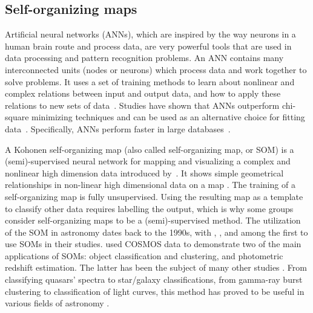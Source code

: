 \subsection{Self-organizing maps}
 \label{sec: som}


 Artificial neural networks (ANNs), which are inspired by the way neurons in a human brain route and process data, are very powerful tools that are used in data processing and pattern recognition problems.
An ANN contains many interconnected units (nodes or neurons) which process data and work together to solve problems.
It uses a set of training methods to learn about nonlinear and complex relations between input and output data, and how to apply these relations to new sets of data~\citep[e.g.][]{Hossein14,Hossein16a,Hossein16b,Ellison16a, Ellison16b}.
Studies have shown that ANNs outperform chi-square minimizing techniques and can be used as an alternative choice for fitting data~\citep[e.g.][]{Marquez91}.
Specifically, ANNs perform faster in large databases~\citep[][]{Gulati97}.



A Kohonen self-organizing map (also called self-organizing map, or SOM) is a (semi)-supervised neural network for mapping and visualizing a complex and nonlinear high dimension data introduced by~\citet{Kohonen82}.
It shows simple geometrical relationships in non-linear high dimensional data on a map \citep{Kohonen98}.
The training of a self-organizing map is fully unsupervised.
     Using the resulting map as a template to classify other data requires labelling the output, which is why some groups consider self-organizing maps to be a (semi)-supervised method.
The utilization of the SOM in astronomy dates back to the 1990s, with \citet[][]{Odewahn92}, \citet[][]{Hernandez94}, and \citet[][]{Murtagh95} among the first to use SOMs in their studies.
\citet{Geach12} used COSMOS data to demonstrate two of the main applications of SOMs: object classification and clustering, and photometric redshift estimation. The latter has been the subject of many other studies \citep[e.g.][]{Kind14a}.
From classifying quasars' spectra to star/galaxy classifications, from gamma-ray burst clustering to classification of light curves, this method has proved to be useful in various fields of astronomy \citep[e.g.][]{Maehoenen95, Miller96, Andreon00, Balastegui01, Rajaniemi02, Brett04, Scaringi09}.



